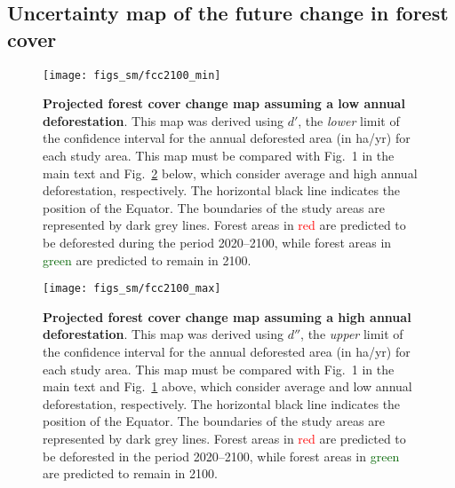 \documentclass[
  12pt,
]{article}
\begin{document}
\hypertarget{uncertainty-map-of-the-future-change-in-forest-cover}{%
\subsection{Uncertainty map of the future change in forest cover}\label{uncertainty-map-of-the-future-change-in-forest-cover}}



\begin{figure}[H]

{\centering \texttt{[image: figs\_sm/fcc2100\_min]} 

}

\caption{\textbf{Projected forest cover change map assuming a low annual deforestation}. This map was derived using \(d'\), the \emph{lower} limit of the confidence interval for the annual deforested area (in ha/yr) for each study area. This map must be compared with Fig.~1 in the main text and Fig.~\ref{fig:fcc2100-high} below, which consider average and high annual deforestation, respectively. The horizontal black line indicates the position of the Equator. The boundaries of the study areas are represented by dark grey lines. Forest areas in \textcolor{red}{red} are predicted to be deforested during the period 2020--2100, while forest areas in \textcolor{darkgreen}{green} are predicted to remain in 2100.}\label{fig:fcc2100-low}
\end{figure}



\begin{figure}[H]

{\centering \texttt{[image: figs\_sm/fcc2100\_max]} 

}

\caption{\textbf{Projected forest cover change map assuming a high annual deforestation}. This map was derived using \(d''\), the \emph{upper} limit of the confidence interval for the annual deforested area (in ha/yr) for each study area. This map must be compared with Fig.~1 in the main text and Fig.~\ref{fig:fcc2100-low} above, which consider average and low annual deforestation, respectively. The horizontal black line indicates the position of the Equator. The boundaries of the study areas are represented by dark grey lines. Forest areas in \textcolor{red}{red} are predicted to be deforested in the period 2020--2100, while forest areas in \textcolor{darkgreen}{green} are predicted to remain in 2100.}\label{fig:fcc2100-high}
\end{figure}
\end{document}
